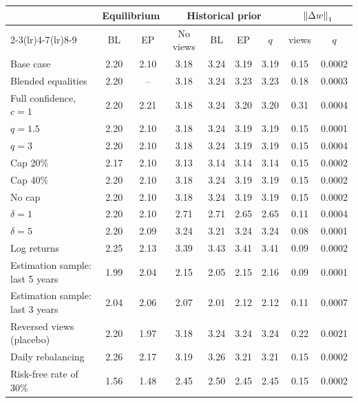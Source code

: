 \begin{tabular}{lcccccccc}
\toprule
 & \multicolumn{2}{c}{Equilibrium} & \multicolumn{4}{c}{Historical prior} & \multicolumn{2}{c}{$\left\lVert \Delta w \right\rVert_1$} \\
\cmidrule(lr){2-3}\cmidrule(lr){4-7}\cmidrule(lr){8-9}
 & BL & EP & No views & BL & EP & $q$ & views & $q$ \\
\midrule
Base case & 2.20 & 2.10 & 3.18 & 3.24 & 3.19 & 3.19 & 0.15 & 0.0002 \\
Blended equalities & 2.20 & -- & 3.18 & 3.24 & 3.23 & 3.23 & 0.18 & 0.0003 \\
Full confidence, $c=1$ & 2.20 & 2.21 & 3.18 & 3.24 & 3.20 & 3.20 & 0.31 & 0.0004 \\
$q = 1.5$ & 2.20 & 2.10 & 3.18 & 3.24 & 3.19 & 3.19 & 0.15 & 0.0001 \\
$q = 3$ & 2.20 & 2.10 & 3.18 & 3.24 & 3.19 & 3.19 & 0.15 & 0.0004 \\
Cap 20\% & 2.17 & 2.10 & 3.13 & 3.14 & 3.14 & 3.14 & 0.15 & 0.0002 \\
Cap 40\% & 2.20 & 2.10 & 3.18 & 3.24 & 3.19 & 3.19 & 0.15 & 0.0002 \\
No cap & 2.20 & 2.10 & 3.18 & 3.24 & 3.19 & 3.19 & 0.15 & 0.0002 \\
$\delta = 1$ & 2.20 & 2.10 & 2.71 & 2.71 & 2.65 & 2.65 & 0.11 & 0.0004 \\
$\delta = 5$ & 2.20 & 2.09 & 3.24 & 3.21 & 3.24 & 3.24 & 0.08 & 0.0001 \\
Log returns & 2.25 & 2.13 & 3.39 & 3.43 & 3.41 & 3.41 & 0.09 & 0.0002 \\
Estimation sample: last 5 years & 1.99 & 2.04 & 2.15 & 2.05 & 2.15 & 2.16 & 0.09 & 0.0001 \\
Estimation sample: last 3 years & 2.04 & 2.06 & 2.07 & 2.01 & 2.12 & 2.12 & 0.11 & 0.0007 \\
Reversed views (placebo) & 2.20 & 1.97 & 3.18 & 3.24 & 3.24 & 3.24 & 0.22 & 0.0021 \\
Daily rebalancing & 2.26 & 2.17 & 3.19 & 3.26 & 3.21 & 3.21 & 0.15 & 0.0002 \\
Risk-free rate of 30\% & 1.56 & 1.48 & 2.45 & 2.50 & 2.45 & 2.45 & 0.15 & 0.0002 \\
\bottomrule
\end{tabular}
